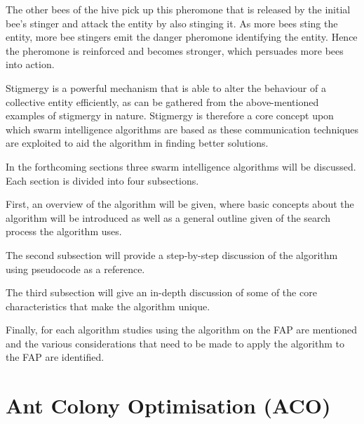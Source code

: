 The other bees of the hive pick up this pheromone that is released by the initial bee's stinger and attack the entity by also stinging it\cite{stigmergicoptimization}. As more bees sting the entity, more bee stingers emit the danger pheromone identifying the entity\cite{stigmergicoptimization}. Hence the pheromone is reinforced and becomes stronger, which persuades more bees into action\cite{stigmergicoptimization}.

Stigmergy is a powerful mechanism that is able to alter the behaviour of a collective entity efficiently, as can be gathered from the above-mentioned examples of stigmergy in nature\cite{AntsAndStigmergy,CompuIntelligenceIntro,AntIntroTrends}. Stigmergy is therefore a core concept upon which swarm intelligence algorithms are based as these communication techniques are exploited to aid the algorithm in finding better solutions\cite{AntsAndStigmergy,CompuIntelligenceIntro,AntIntroTrends}.

In the forthcoming sections three swarm intelligence algorithms will be discussed. Each section is divided into four subsections. 

First, an overview of the algorithm will be given, where basic concepts about the algorithm will be introduced as well as a general outline given of the search process the algorithm uses. 

The second subsection will provide a step-by-step discussion of the algorithm using pseudocode as a reference.

The third subsection will give an in-depth discussion of some of the core characteristics that make the algorithm unique. 

Finally, for each algorithm studies using the algorithm on the FAP are mentioned and the various considerations that need to be made to apply the algorithm to the FAP are identified.

\section{Ant Colony Optimisation (ACO)}
\label{sec:ACO}
